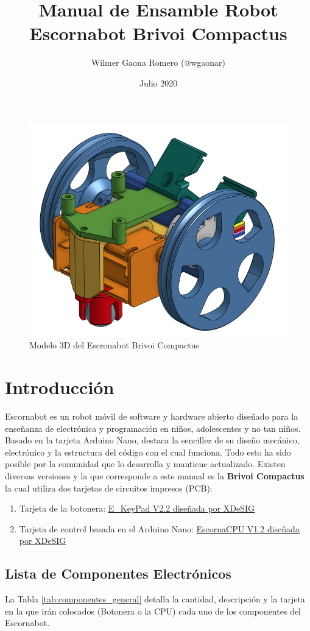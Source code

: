 \documentclass{article}
\title{Manual de Ensamble Robot Escornabot Brivoi Compactus}
\author{Wilmer Gaona Romero (@wgaonar)}
\date{Julio 2020}
\begin{document}
\maketitle

\begin{figure}[H]
    \centering
    \includegraphics[width=0.5\columnwidth]{images/portadaOnshape.png}
    \caption{Modelo 3D del Escronabot Brivoi Compactus}
    \label{fig:modelo3D}
\end{figure}

\section{Introducción}
Escornabot es un robot móvil de software y hardware abierto diseñado para la enseñanza de electrónica y programación en niños, adolescentes y no tan niños. Basado en la tarjeta Arduino Nano, destaca la sencillez de su diseño mecánico, electrónico y la estructura del código con el cual funciona. Todo esto ha sido posible por la comunidad que lo desarrolla y mantiene actualizado. Existen diversas versiones y la que corresponde a este manual es la \textbf{Brivoi Compactus} la cual utiliza dos tarjetas de circuitos impresos (PCB):

\begin{enumerate}
     \item Tarjeta de la botonera: \href{https://github.com/xdesig/escornabot-electronics/tree/master/Electronics/E_KEYPAD/E_KEYPAD_2.20}{E\_KeyPad V2.2 diseñada por XDeSIG}
     \item Tarjeta de control basada en el Arduino Nano:
     \href{https://github.com/xdesig/escornabot-electronics/tree/master/Electronics/EscornaCPU/1.x/1.20}{EscornaCPU V1.2 diseñada por XDeSIG}
\end{enumerate}

\subsection{Lista de Componentes Electrónicos}
La Tabla \ref{tab:componentes_general} detalla la cantidad, descripción y la tarjeta en la que irán colocados (Botonera o la CPU) cada uno de los componentes del Escornabot. 
\end{document}
